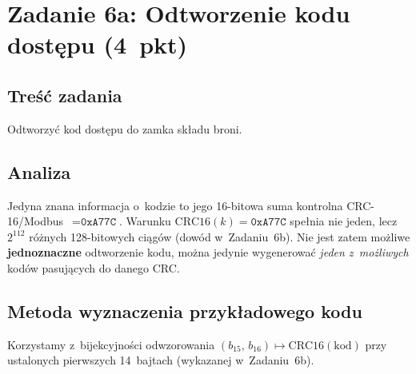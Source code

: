 \documentclass[12pt,a4paper]{article}
\begin{document}
\section*{Zadanie 6a: Odtworzenie kodu dostępu (4~pkt)}

\subsection*{Treść zadania}

Odtworzyć kod dostępu do zamka składu broni.

\subsection*{Analiza}

Jedyna znana informacja o~kodzie to jego 16-bitowa suma kontrolna
CRC-16/Modbus~$= \texttt{0xA77C}$.
Warunku $\mathrm{CRC16}(k) = \texttt{0xA77C}$ spełnia nie jeden, lecz
$2^{112}$ różnych 128-bitowych ciągów (dowód w~Zadaniu~6b).
Nie jest zatem możliwe \textbf{jednoznaczne} odtworzenie kodu, można
jedynie wygenerować \emph{jeden z~możliwych} kodów pasujących do danego CRC.

\subsection*{Metoda wyznaczenia przykładowego kodu}

Korzystamy z~bijekcyjności odwzorowania
$(b_{15},\, b_{16}) \mapsto \mathrm{CRC16}(\text{kod})$
przy ustalonych pierwszych 14~bajtach (wykazanej w~Zadaniu~6b).
\end{document}
